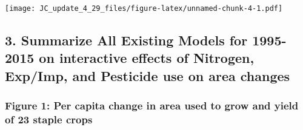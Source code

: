 \documentclass[
]{article}
\newenvironment{Shaded}{\begin{snugshade}}{\end{snugshade}}
\newcommand{\DataTypeTok}[1]{\textcolor[rgb]{0.13,0.29,0.53}{#1}}
\newcommand{\DecValTok}[1]{\textcolor[rgb]{0.00,0.00,0.81}{#1}}
\newcommand{\KeywordTok}[1]{\textcolor[rgb]{0.13,0.29,0.53}{\textbf{#1}}}
\newcommand{\NormalTok}[1]{#1}
\newcommand{\OperatorTok}[1]{\textcolor[rgb]{0.81,0.36,0.00}{\textbf{#1}}}
\newcommand{\StringTok}[1]{\textcolor[rgb]{0.31,0.60,0.02}{#1}}
\begin{document}
\begin{Shaded}
\end{Shaded}

\texttt{[image: JC\_update\_4\_29\_files/figure-latex/unnamed-chunk-4-1.pdf]}

\hypertarget{summarize-all-existing-models-for-1995-2015-on-interactive-effects-of-nitrogen-expimp-and-pesticide-use-on-area-changes}{%
\subsection{3. Summarize All Existing Models for 1995-2015 on
interactive effects of Nitrogen, Exp/Imp, and Pesticide use on area
changes}\label{summarize-all-existing-models-for-1995-2015-on-interactive-effects-of-nitrogen-expimp-and-pesticide-use-on-area-changes}}

\hypertarget{figure-1-per-capita-change-in-area-used-to-grow-and-yield-of-23-staple-crops}{%
\subsubsection{Figure 1: Per capita change in area used to grow and
yield of 23 staple
crops}\label{figure-1-per-capita-change-in-area-used-to-grow-and-yield-of-23-staple-crops}}
\end{document}
